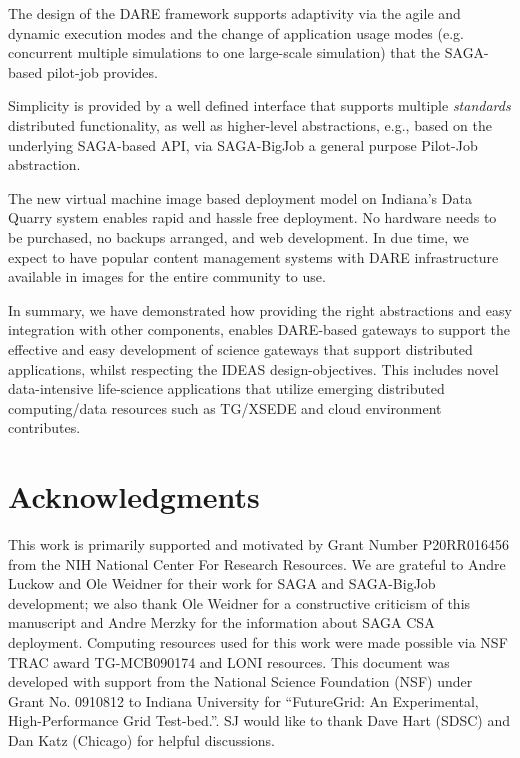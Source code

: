 \documentclass[]{svjour3}
\begin{document}
The design of the DARE framework supports adaptivity via the agile and
dynamic execution modes and the change of application usage modes
(e.g. concurrent multiple simulations to one large-scale simulation)
that the SAGA-based pilot-job provides.



Simplicity is provided by a well defined interface that supports
multiple {\it standards} distributed functionality, as well as
higher-level abstractions, e.g., based on the underlying SAGA-based
API, via SAGA-BigJob a general purpose Pilot-Job abstraction.

The new virtual machine image based deployment model on Indiana's Data
Quarry system enables rapid and hassle free deployment. No hardware
needs to be purchased, no backups arranged, and web development. In
due time, we expect to have popular content management systems with
DARE infrastructure available in images for the entire community to use.

In summary, we have demonstrated how providing the right abstractions
and easy integration with other components, enables DARE-based
gateways to support the effective and easy development of science
gateways that support distributed applications, whilst respecting the
IDEAS design-objectives. This includes novel data-intensive
life-science applications that utilize emerging distributed
computing/data resources such as TG/XSEDE and cloud environment
contributes.



\section{Acknowledgments}
This work is primarily supported and motivated by Grant Number
P20RR016456 from the NIH National Center For Research Resources. We
are grateful to Andre Luckow and Ole Weidner for their work for SAGA
and SAGA-BigJob development; we also thank Ole Weidner for a
constructive criticism of this manuscript and Andre Merzky for the information about SAGA CSA deployment. Computing resources used for this work were made possible via NSF TRAC award TG-MCB090174 and
LONI resources. This document was developed with support from the
National Science Foundation (NSF) under Grant No. 0910812 to Indiana
University for ``FutureGrid: An Experimental, High-Performance Grid
Test-bed.''. SJ would like to thank Dave Hart (SDSC) and Dan Katz
(Chicago) for helpful discussions.



%

%

\end{document}

